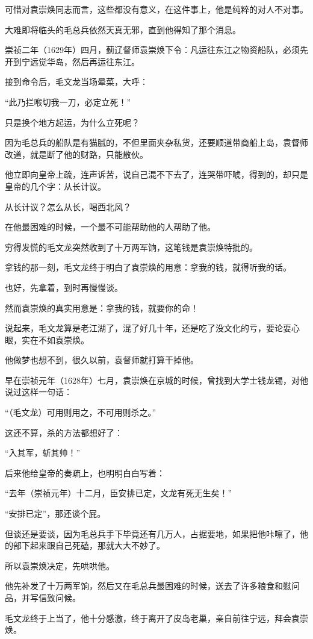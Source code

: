 \begin{multicols}{\theparacolNo}
可惜对袁崇焕同志而言，这些都没有意义，在这件事上，他是纯粹的对人不对事。

大难即将临头的毛总兵依然天真无邪，直到他得知了那个消息。

崇祯二年（1629年）四月，蓟辽督师袁崇焕下令：凡运往东江之物资船队，必须先开到宁远觉华岛，然后再运往东江。

接到命令后，毛文龙当场晕菜，大呼：

“此乃拦喉切我一刀，必定立死！”

只是换个地方起运，为什么立死呢？

因为毛总兵的船队是有猫腻的，不但里面夹杂私货，还要顺道带商船上岛，袁督师改道，就是断了他的财路，只能散伙。

他立即向皇帝上疏，连声诉苦，说自己混不下去了，连哭带吓唬，得到的，却只是皇帝的几个字：从长计议。

从长计议？怎么从长，喝西北风？

在他最困难的时候，一个最不可能帮助他的人帮助了他。

穷得发慌的毛文龙突然收到了十万两军饷，这笔钱是袁崇焕特批的。

拿钱的那一刻，毛文龙终于明白了袁崇焕的用意：拿我的钱，就得听我的话。

也好，先拿着，到时再慢慢谈。

然而袁崇焕的真实用意是：拿我的钱，就要你的命！

说起来，毛文龙算是老江湖了，混了好几十年，还是吃了没文化的亏，要论耍心眼，实在不如袁崇焕。

他做梦也想不到，很久以前，袁督师就打算干掉他。

早在崇祯元年（1628年）七月，袁崇焕在京城的时候，曾找到大学士钱龙锡，对他说过这样一句话：

“（毛文龙）可用则用之，不可用则杀之。”

这还不算，杀的方法都想好了：

“入其军，斩其帅！”

后来他给皇帝的奏疏上，也明明白白写着：

“去年（崇祯元年）十二月，臣安排已定，文龙有死无生矣！”

“安排已定”，那还谈个屁。

但谈还是要谈，因为毛总兵手下毕竟还有几万人，占据要地，如果把他咔嚓了，他的部下起来跟自己死磕，那就大大不妙了。

所以袁崇焕决定，先哄哄他。

他先补发了十万两军饷，然后又在毛总兵最困难的时候，送去了许多粮食和慰问品，并写信致问候。

毛文龙终于上当了，他十分感激，终于离开了皮岛老巢，亲自前往宁远，拜会袁崇焕。


\end{multicols}
